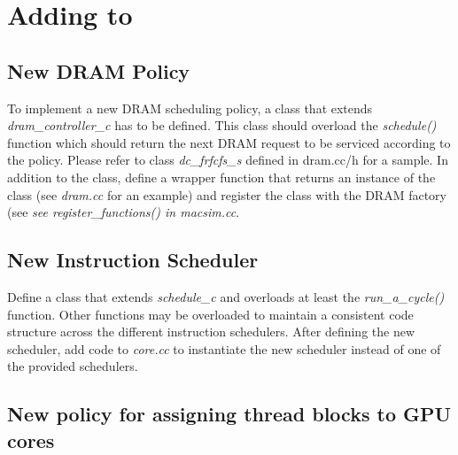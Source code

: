 


\chapter{Adding to \SIM}
\label{sec:add_macsim}


\section{New DRAM Policy}


To implement a new DRAM scheduling policy, a class that extends
\textit{dram\_controller\_c} has to be defined. This class should
overload the \textit{schedule()} function which should return the next
DRAM request to be serviced according to the policy. Please refer to
class \textit{dc\_frfcfs\_s} defined in dram.cc/h for a sample. In
addition to the class, define a wrapper function that returns an
instance of the class (see \textit{dram.cc} for an example) and
register the class with the DRAM factory (see \textit{see
  register\_functions() in \textit{macsim.cc}}.


\section{New Instruction Scheduler}


Define a class that extends \textit{schedule\_c} and overloads at least the
\textit{run\_a\_cycle()} function. Other functions may be overloaded to
maintain a consistent code structure across the different instruction
schedulers. After defining the new scheduler, add code to \textit{core.cc} to
instantiate the new scheduler instead of one of the provided schedulers.


\section{New policy for assigning thread blocks to GPU cores}


